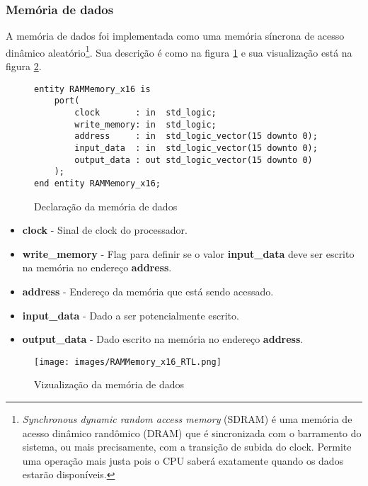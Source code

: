 \documentclass{article}
\newcommand\tab[1][0.50cm]{\hspace*{#1}}
\begin{document}
			\subsubsection[Mem\'{o}ria de dados]{Mem\'{o}ria de dados}
				\tab A mem\'{o}ria de dados foi implementada como uma mem\'{o}ria s\'{i}ncrona de acesso din\^{a}mico aleat\'{o}rio\footnote{\textit{Synchronous dynamic random access memory} (SDRAM) \'{e} uma mem\'{o}ria de acesso din\^{a}mico rand\^{o}mico (DRAM) que \'{e} sincronizada com o barramento do sistema, ou mais precisamente, com a transi\c{c}\~{a}o de subida do clock. Permite uma opera\c{c}\~{a}o mais justa pois o CPU saber\'{a} exatamente quando os dados estar\~{a}o dispon\'{i}veis.}. Sua descri\c{c}\~{a}o \'{e} como na figura \ref{fig:RAMMemory_x16} e sua visualiza\c{c}\~{a}o est\'{a} na figura \ref{fig:RAMMemory_x16_RTL}.
				\begin{figure}[H]
					\centering
					\caption[Mem\'{o}ria de dados]{Declara\c{c}\~{a}o da mem\'{o}ria de dados}
					\label{fig:RAMMemory_x16}
					\begin{lstlisting}[style=vhdl]
entity RAMMemory_x16 is
	port(
		clock   	: in  std_logic;
		write_memory: in  std_logic;
		address 	: in  std_logic_vector(15 downto 0);
		input_data  : in  std_logic_vector(15 downto 0);
		output_data : out std_logic_vector(15 downto 0)
	);
end entity RAMMemory_x16;
					\end{lstlisting}
				\end{figure}
				\begin{itemize}
					\item \textbf{clock} - Sinal de clock do processador.
					\item \textbf{write\_memory} - Flag para definir se o valor \textbf{input\_data} deve ser escrito na mem\'{o}ria no endere\c{c}o \textbf{address}.
					\item \textbf{address} - Endere\c{c}o da mem\'{o}ria que est\'{a} sendo acessado.
					\item \textbf{input\_data} - Dado a ser potencialmente escrito.
					\item \textbf{output\_data} - Dado escrito na mem\'{o}ria no endere\c{c}o \textbf{address}.
				\end{itemize}
				\begin{figure}[H]
					\centering
					\caption[Vizualiza\c{c}\~{a}o da mem\'{o}ria de dados]{Vizualiza\c{c}\~{a}o da mem\'{o}ria de dados}
					\label{fig:RAMMemory_x16_RTL}
					\texttt{[image: images/RAMMemory\_x16\_RTL.png]}
				\end{figure}
\end{document}
